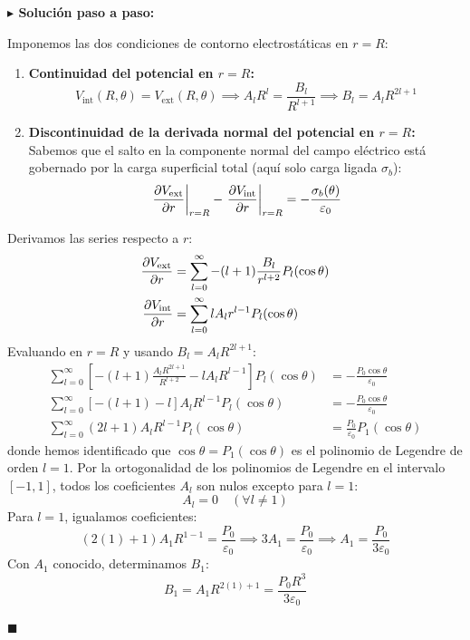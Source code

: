 \documentclass[11pt,a4paper]{book}
\newenvironment{solucion}{%
    \par\medskip\noindent\textbf{\color{blue!65!black}\Large $\blacktriangleright$ Solución paso a paso:}\par\medskip
}{%
    \hfill$\blacksquare$\par\bigskip
}
\begin{document}
\begin{solucion}
Imponemos las dos condiciones de contorno electrostáticas en $r = R$:
\begin{enumerate}
    \item \textbf{Continuidad del potencial en $r = R$:}
    \begin{equation}
        V_{\text{int}}(R,\theta) = V_{\text{ext}}(R,\theta) \implies A_l R^l = \frac{B_l}{R^{l+1}} \implies B_l = A_l R^{2l+1}
    \end{equation}
    
    \item \textbf{Discontinuidad de la derivada normal del potencial en $r = R$:}
    Sabemos que el salto en la componente normal del campo eléctrico está gobernado por la carga superficial total (aquí solo carga ligada $\sigma_b$):
    \begin{equation}
        \left. \pdv{V_{\text{ext}}}{r} \right|_{r=R} - \left. \pdv{V_{\text{int}}}{r} \right|_{r=R} = -\frac{\sigma_b(\theta)}{\varepsilon_0}
    \end{equation}
\end{enumerate}

Derivamos las series respecto a $r$:
\begin{align}
    \pdv{V_{\text{ext}}}{r} &= \sum_{l=0}^{\infty} -(l+1)\frac{B_l}{r^{l+2}} P_l(\cos\theta) \\
    \pdv{V_{\text{int}}}{r} &= \sum_{l=0}^{\infty} l A_l r^{l-1} P_l(\cos\theta)
\end{align}
Evaluando en $r = R$ y usando $B_l = A_l R^{2l+1}$:
\begin{align}
    \sum_{l=0}^{\infty} \left[ -(l+1)\frac{A_l R^{2l+1}}{R^{l+2}} - l A_l R^{l-1} \right] P_l(\cos\theta) &= -\frac{P_0 \cos\theta}{\varepsilon_0} \\
    \sum_{l=0}^{\infty} \left[ -(l+1) - l \right] A_l R^{l-1} P_l(\cos\theta) &= -\frac{P_0 \cos\theta}{\varepsilon_0} \\
    \sum_{l=0}^{\infty} (2l+1) A_l R^{l-1} P_l(\cos\theta) &= \frac{P_0}{\varepsilon_0} P_1(\cos\theta)
\end{align}
donde hemos identificado que $\cos\theta = P_1(\cos\theta)$ es el polinomio de Legendre de orden $l=1$. Por la ortogonalidad de los polinomios de Legendre en el intervalo $[-1,1]$, todos los coeficientes $A_l$ son nulos excepto para $l = 1$:
\begin{equation}
    A_l = 0 \quad (\forall l \neq 1)
\end{equation}
Para $l = 1$, igualamos coeficientes:
\begin{equation}
    (2(1)+1) A_1 R^{1-1} = \frac{P_0}{\varepsilon_0} \implies 3 A_1 = \frac{P_0}{\varepsilon_0} \implies A_1 = \frac{P_0}{3\varepsilon_0}
\end{equation}
Con $A_1$ conocido, determinamos $B_1$:
\begin{equation}
    B_1 = A_1 R^{2(1)+1} = \frac{P_0 R^3}{3\varepsilon_0}
\end{equation}


\end{solucion}
\end{document}
